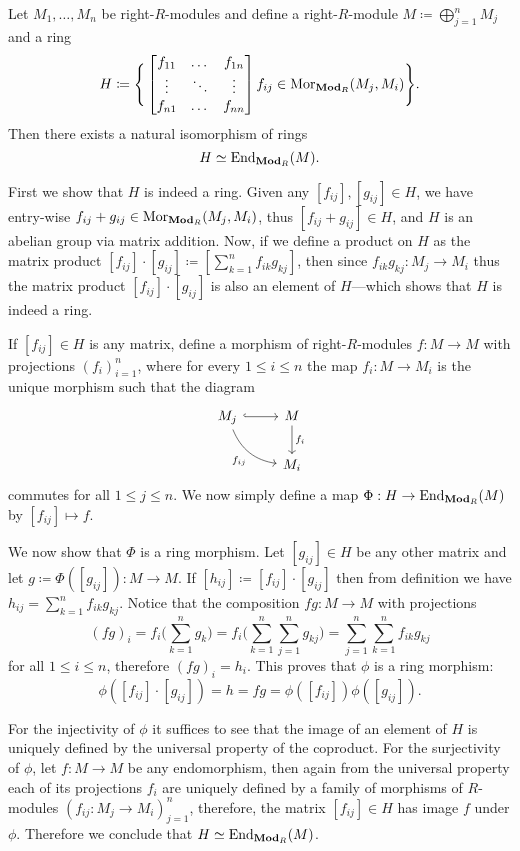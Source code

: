 \begin{example}
\label{exp:matrix-of-morphisms}
Let \(M_1, \dots, M_n\) be right-\(R\)-modules and define a right-\(R\)-module
\(M \coloneq \bigoplus_{j=1}^n M_j\) and a ring
\[
H \coloneq \Bigg\{
\begin{bmatrix}
  f_{1 1} &\dots  &f_{1 n} \\
  \vdots &\ddots &\vdots \\
  f_{n 1} &\dots  &f_{n n}
\end{bmatrix}
\relax f_{i j} \in \operatorname{Mor}_{{\textbf{Mod}_{R}}}(M_j, M_i)
\Bigg\}.
\]
Then there exists a natural isomorphism of rings
\[
H \simeq \operatorname{End}_{{\textbf{Mod}_{R}}}(M).
\]

First we show that \(H\) is indeed a ring. Given any
\([f_{i j}], [g_{ij}] \in H\), we have entry-wise
\(f_{i j} + g_{i j} \in \operatorname{Mor}_{{\textbf{Mod}_{R}}}(M_j, M_i)\), thus
\([f_{i j} + g_{i j}] \in H\), and \(H\) is an abelian group via matrix
addition. Now, if we define a product on \(H\) as the matrix product
\([f_{ij}] \cdot [g_{ij}] \coloneq [\sum_{k=1}^n f_{i k} g_{k j}]\), then since
\(f_{i k} g_{k j}: M_j \to M_i\) thus the matrix product
\([f_{i j}] \cdot [g_{ij}]\) is also an element of \(H\)---which shows that
\(H\) is indeed a ring.

If \([f_{i j}] \in H\) is any matrix, define a morphism of right-\(R\)-modules
\(f: M \to M\) with projections \((f_i)_{i=1}^n\), where for every
\(1 \leq i \leq n\) the map \(f_i: M \to M_i\) is the unique morphism such that
the diagram
\[
\begin{tikzcd}
M_j \ar[r, hook] \ar[rd, bend right, "f_{ij}"'] &M \ar[d, "f_i"] \\
&M_i
\end{tikzcd}
\]
commutes for all \(1 \leq j \leq n\). We now simply define a map \(\Phi: H \to
\operatorname{End}_{{\textbf{Mod}_{R}}}(M)\) by \([f_{ij}] \mapsto f\).

We now show that \(\Phi\) is a ring morphism. Let \([g_{ij}] \in H\) be any
other matrix and let \(g \coloneq \Phi([g_{ij}]): M \to M\). If
\([h_{ij}] \coloneq [f_{i j}] \cdot [g_{i j}]\) then from definition we have
\(h_{ij} = \sum_{k=1}^n f_{i k} g_{k j}\). Notice that the composition \(f g: M
\to M\) with projections
\[
(f g)_i = f_i\bigg(\sum_{k=1}^n g_k\bigg)
= f_i \bigg(\sum_{k=1}^n \sum_{j=1}^n g_{k j} \bigg)
= \sum_{j=1}^n \sum_{k=1}^n f_{i k} g_{k j}
\]
for all \(1 \leq i \leq n\), therefore \((f g)_i = h_i\). This proves that
\(\phi\) is a ring morphism:
\[
\phi([f_{i j}] \cdot [g_{i j}]) = h = f g = \phi([f_{i j}]) \phi([g_{i j}]).
\]

For the injectivity of \(\phi\) it suffices to see that the image of an element
of \(H\) is uniquely defined by the universal property of the coproduct. For the
surjectivity of \(\phi\), let \(f: M \to M\) be any endomorphism, then again
from the universal property each of its projections \(f_i\) are uniquely defined
by a family of morphisms of \(R\)-modules \((f_{i j}: M_j \to M_i)_{j=1}^n\),
therefore, the matrix \([f_{i j}] \in H\) has image \(f\) under
\(\phi\). Therefore we conclude that \(H \simeq \operatorname{End}_{{\textbf{Mod}_{R}}}(M)\).
\end{example}

